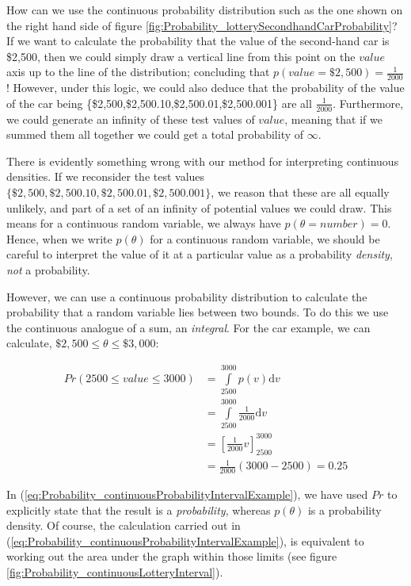 \documentclass[11pt,fullpage]{book}
\begin{document}
How can we use the continuous probability distribution such as the one shown on the right hand side of figure \ref{fig:Probability_lotterySecondhandCarProbability}? If we want to calculate the probability that the value of the second-hand car is \$2,500, then we could simply draw a vertical line from this point on the $value$ axis up to the line of the distribution; concluding that $p(value=\$2,500) = \frac{1}{2000}$! However, under this logic, we could also deduce that the probability of the value of the car being \{\$2,500,\$2,500.10,\$2,500.01,\$2,500.001\} are all $\frac{1}{2000}$. Furthermore, we could generate an infinity of these test values of $value$, meaning that if we summed them all together we could get a total probability of $\infty$. 

There is evidently something wrong with our method for interpreting continuous densities. If we reconsider the test values $\{\$2,500,\$2,500.10,\$2,500.01,\$2,500.001\}$, we reason that these are all equally unlikely, and part of a set of an infinity of potential values we could draw. This means for a continuous random variable, we always have $p(\theta=number) = 0$. Hence, when we write $p(\theta)$ for a continuous random variable, we should be careful to interpret the value of it at a particular value as a probability \textit{density}, \textit{not} a probability. 

However, we can use a continuous probability distribution to calculate the probability that a random variable lies between two bounds. To do this we use the continuous analogue of a sum, an \textit{integral}. For the car example, we can calculate, $\$2,500\leq \theta \leq \$3,000$:

\begin{align}\label{eq:Probability_continuousProbabilityIntervalExample}
Pr(2500\leq value \leq 3000) &= \int\limits_{2500}^{3000} p(v) \mathrm{d}v\\
&= \int\limits_{2500}^{3000} \frac{1}{2000} \mathrm{d}v\\
&= \left[\frac{1}{2000}v\right]_{2500}^{3000}\\ 
&= \frac{1}{2000}(3000-2500) = 0.25
\end{align}

In (\ref{eq:Probability_continuousProbabilityIntervalExample}), we have used $Pr$ to explicitly state that the result is a \textit{probability}, whereas $p(\theta)$ is a probability density. Of course, the calculation carried out in (\ref{eq:Probability_continuousProbabilityIntervalExample}), is equivalent to working out the area under the graph within those limits (see figure \ref{fig:Probability_continuousLotteryInterval}).
\end{document}
